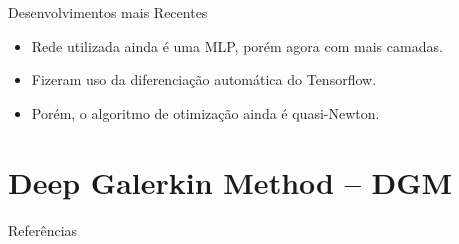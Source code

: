 \documentclass[13pt]{beamer}
\begin{document}
\begin{frame}{Desenvolvimentos mais Recentes}
    \begin{itemize}
        \item<1-> Rede utilizada ainda é uma MLP, porém agora com mais camadas.
        \item<2-> Fizeram uso da diferenciação automática do Tensorflow.
        \item<3-> Porém, o algoritmo de otimização ainda é quasi-Newton.
    \end{itemize}
\end{frame}

\section{Deep Galerkin Method -- DGM}




\begin{frame}[allowframebreaks]{Referências}
    \printbibliography
\end{frame}
\end{document}
